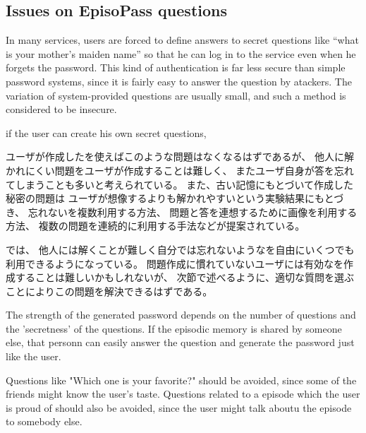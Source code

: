 \documentclass{article}
\begin{document}
\subsection{Issues on EpisoPass questions}


In many services, users are forced to define answers to secret questions like
``what is your mother's maiden name''
so that he can log in to the service even when he forgets the password.
This kind of authentication is far less secure than simple password systems,
since it is fairly easy to answer the question by atackers.
The variation of system-provided questions are usually small, and
such a method is considered to be insecure\cite{Rabkin:2008:PKQ:1408664.1408667}.

if the user can create his own secret questions,

ユーザが作成した{\SQ}を使えばこのような問題はなくなるはずであるが、
他人に解かれにくい問題をユーザが作成することは難しく、
またユーザ自身が答を忘れてしまうことも多いと考えられている\cite{Just:2009:PCC:1572532.1572543}\cite{Schechter:2009:NSM:1607723.1608145}。
%
また、古い記憶にもとづいて作成した秘密の問題は
ユーザが想像するよりも解かれやすいという実験結果にもとづき、
忘れない{\SQ}を複数利用する方法、
問題と答を連想するために画像を利用する方法、
複数の問題を連続的に利用する手法などが提案されている\cite{Renaud:2010:PQE:2146303.2146318}。

{\EP}では、
他人には解くことが難しく自分では忘れないような{\SQ}を自由にいくつでも利用できるようになっている。
問題作成に慣れていないユーザには有効な{\SQ}を作成することは難しいかもしれないが、
次節で述べるように、適切な質問を選ぶことによりこの問題を解決できるはずである。

The strength of the generated password depends on the number of
questions and the 'secretness' of the questions.
If the episodic memory is shared by someone else,
that personn can easily answer the question and generate the
password just like the user.

Questions like "Which one is your favorite?" should be avoided,
since some of the friends might know the user's taste.
Questions related to a episode which the user is proud of should also be
avoided, since the user might talk aboutu the episode to somebody else.
\end{document}
